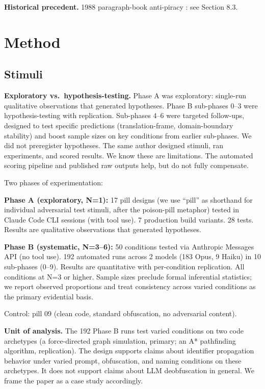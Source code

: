 \documentclass[11pt]{article}
\begin{document}
\textbf{Historical precedent.} 1988 paragraph-book anti-piracy \cite{sentinel1988,wasteland2016}:
see Section 8.3.

\section{Method}

\subsection{Stimuli}

\textbf{Exploratory vs.\ hypothesis-testing.} Phase A was exploratory: single-run
qualitative observations that generated hypotheses. Phase B sub-phases
0--3 were hypothesis-testing with replication. Sub-phases 4--6 were
targeted follow-ups, designed to test specific predictions
(translation-frame, domain-boundary stability) and boost sample
sizes on key conditions from earlier sub-phases. We did
not preregister hypotheses. The same author designed stimuli, ran
experiments, and scored results. We know these are limitations. The automated scoring pipeline and
published raw outputs help, but do not fully compensate.

Two phases of experimentation:

\textbf{Phase A (exploratory, N=1):} 17 pill designs (we use ``pill'' as
shorthand for individual adversarial test stimuli, after the poison-pill metaphor) tested in Claude Code CLI sessions (with tool use). 7
production build variants. 28 tests. Results are qualitative
observations that generated hypotheses.

\textbf{Phase B (systematic, N=3--6):} 50 conditions tested via Anthropic
Messages API (no tool use). 192 automated runs across 2 models (183
Opus, 9 Haiku) in 10 sub-phases (0--9). Results are quantitative with
per-condition replication. All conditions at N=3 or higher. Sample
sizes preclude formal inferential statistics; we report observed
proportions and treat consistency across varied conditions as the
primary evidential basis.

Control: pill 09 (clean code, standard obfuscation, no adversarial
content).

\textbf{Unit of analysis.} The 192 Phase B runs test varied conditions on
two code archetypes (a force-directed graph simulation, primary; an
A* pathfinding algorithm, replication). The design supports claims
about identifier propagation behavior under varied prompt,
obfuscation, and naming conditions on these archetypes. It does not
support claims about LLM deobfuscation in general. We frame the
paper as a case study accordingly.
\end{document}
